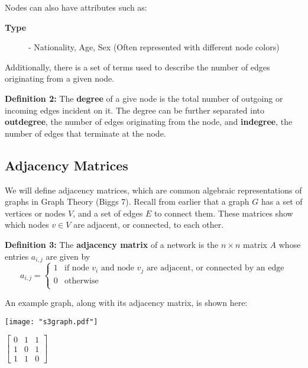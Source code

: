 \documentclass{article}
\begin{document}
\bigskip

\noindent Nodes can also have attributes such as:
\bigskip
\begin{description}
  \item[\textbf{Type}] - Nationality, Age, Sex (Often represented with different node colors)
\end{description}
\bigskip

Additionally, there is a set of terms used to describe the number of edges originating from a given node.

\bigskip

\textbf{Definition 2:} The \textbf{degree} of a give node is the total number of outgoing or incoming edges incident on it. 
The degree can be further separated into \textbf{outdegree}, the number of edges originating from the node, and \textbf{indegree},
the number of edges that terminate at the node.

\subsection{Adjacency Matrices}
We will define adjacency matrices, which are common algebraic representations of graphs in Graph Theory (Biggs 7).
Recall from earlier that a graph $G$ has a set of vertices or nodes $V$, and a set of edges $E$ to connect them.
These matrices show which nodes $v \in V$ are adjacent, or connected, to each other.

\bigskip

\textbf{Definition 3:} The \textbf{adjacency matrix} of a network is the $n \times n$ matrix $A$ whose entries $a_{i,j}$ are given by
\[   
a_{i,j} = 
     \begin{cases}
       1 & \text{if node } v_i \text{ and node } v_j \text{ are adjacent, or connected by an edge} \\
       0 & \text{otherwise} \\
     \end{cases}
\]

\bigskip

An example graph, along with its adjacency matrix, is shown here:

\bigskip

\noindent\begin{minipage}{.5\textwidth}
\centering
\texttt{[image: "s3graph.pdf"]}
\label{fig:fig1}            
\end{minipage}%
\begin{minipage}{.5\textwidth}
\centering
\vspace{1.2cm}
$\begin{bmatrix}
0 & 1 & 1\\
1 & 0 & 1\\
1 & 1 & 0
\end{bmatrix}$
\vspace{1.1cm}

\label{fig:fig2}            
\end{minipage}
\end{document}
